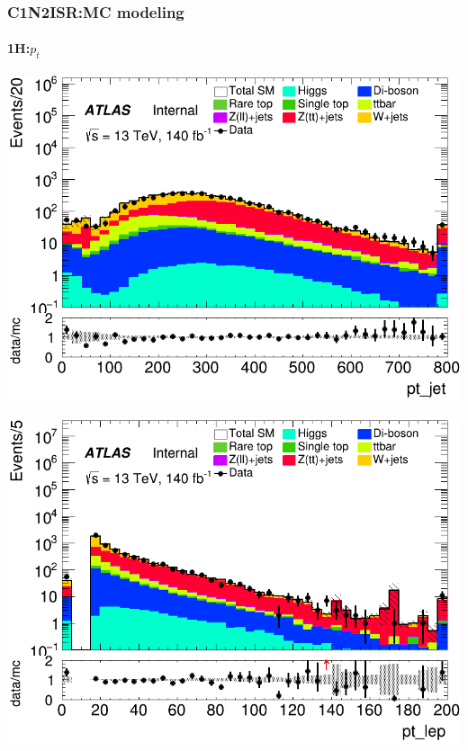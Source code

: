 \documentclass[usenames,dvipsnames]{beamer}
\begin{document}
\begin{frame}
\frametitle{C1N2ISR:MC modeling}
\framesubtitle{1H:\quad $p_t$}
    \begin{minipage}{0.32\textwidth}
        \centering
        \includegraphics[width=\textwidth]{graphics/H_met/H_met_pt_jet.png}
    \end{minipage}
    \hfill
    \begin{minipage}{0.32\textwidth}
        \centering
        \includegraphics[width=\textwidth]{graphics/H_met/H_met_pt_lep.png}
    \end{minipage}
    \hfill
    \begin{minipage}{0.32\textwidth}
        \centering

\end{minipage}
\end{frame}
\end{document}
